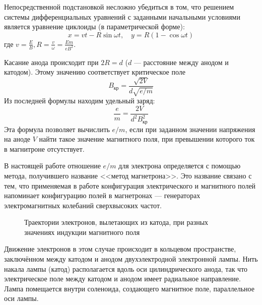 \documentclass[a4paper,12pt]{article}
\begin{document}
	Непосредственной подстановкой несложно убедиться в том, что решением системы дифференциальных уравнений с заданными начальными условиями является уравнение циклоиды (в параметрической форме):
	$$x = v t - R \sin \omega t, \quad y = R(1 - \cos \omega t)$$
	где $v = \frac{E}{B}, R = \frac{v}{\omega} = \frac{E m}{e B^2}$.

	Касание анода происходит при $2R = d$ ($d$ --- расстояние между анодом и катодом). Этому значению соответствует критическое поле
	$$B_\text{кр} = \frac{\sqrt{2V}}{d \sqrt{e / m}}$$
	Из последней формулы находим удельный заряд:
	$$\frac{e}{m} = \frac{2V}{d^2 B_\text{кр}^2}$$
	Эта формула позволяет вычислить $e / m$, если при заданном значении напряжения на аноде $V$ 
	найти такое значение магнитного поля, при превышении которого ток в магнитроне отсутствует.

	В настоящей работе отношение $e / m$ для электрона определяется с помощью метода, получившего 
	название <<метод магнетрона>>. Это название связано с тем, что применяемая в работе конфигурация
	электрического и магнитного полей напоминает конфигурацию полей в магнетронах --- генераторах 
	электромагнитных колебаний сверхвысоких частот.

	\begin{figure}[h!]
		\caption[]{\label{fig:1} Траектории электронов, вылетающих из катода, при разных значениях индукции магнитного поля}
	\end{figure}	

	Движение электронов в этом случае происходит в кольцевом пространстве, заключённом между катодом и анодом двухэлектродной электронной лампы. Нить накала лампы (катод) располагается вдоль оси цилиндрического анода, так что электрическое поле между катодом и анодом имеет радиальное направление. Лампа помещается внутри соленоида, создающего магнитное поле, параллельное оси лампы.
\end{document}
